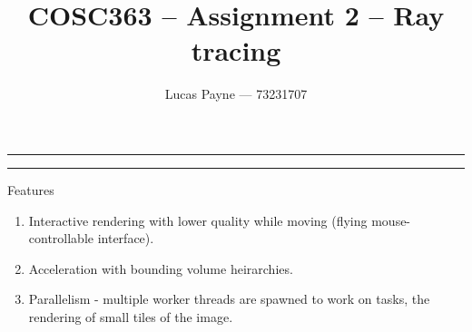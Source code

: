 \documentclass{article}
\begin{document}
\title{COSC363 -- Assignment 2 -- Ray tracing}
\author{Lucas Payne --- 73231707}
\date{}
\maketitle
\vskip -0.2in
\hrule
\vskip 0.03in
\hrule
\vskip 0.2in

\newcommand{\thing}[3]{
\vskip 0.2in
\hrule
\vskip 0.03in
\hrule
\vskip 0.1in
    \textbf{\textit{#3 #1}}:
#2
\vskip 0.1in
\hrule
\vskip 0.03in
\hrule
\vskip 0.2in
}
\newcommand{\feature}[2]{\thing{#1}{#2}{Feature}}
\newcommand{\leadin}[2]{
    \textit{#1}
    \vskip 0.1in
    \hrule
    \vskip 0.08in
    #2
    \vskip 0.6cm
}

Features
\begin{enumerate}
\item Interactive rendering with lower quality while moving (flying mouse-controllable interface).
\item Acceleration with bounding volume heirarchies.
\item Parallelism - multiple worker threads are spawned to work on tasks, the rendering of small tiles of the image.
\end{enumerate}
\end{document}
